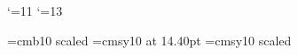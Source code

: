 

\loadeusm

\catcode`\@=11
\def\logo@{}
\catcode`\@=13

\NoRunningHeads



\font\boldtitlefont=cmb10 scaled
\font\bigsym=cmsy10 at 14.40pt 
\font\biggersym=cmsy10 scaled 

\def\dspace{\lineskip=2pt\baselineskip=18pt\lineskiplimit=0pt}
\def\wedgeop{\operatornamewithlimits{\wedge}\limits}
\def\w{{\mathchoice{\,{\scriptstyle\wedge}\,}
  {{\scriptstyle\wedge}}
  {{\scriptscriptstyle\wedge}}{{\scriptscriptstyle\wedge}}}}
\def\Le{{\mathchoice{\,{\scriptstyle\le}\,}
  {\,{\scriptstyle\le}\,}
  {\,{\scriptscriptstyle\le}\,}{\,{\scriptscriptstyle\le}\,}}}
\def\Ge{{\mathchoice{\,{\scriptstyle\ge}\,}
  {\,{\scriptstyle\ge}\,}
  {\,{\scriptscriptstyle\ge}\,}{\,{\scriptscriptstyle\ge}\,}}}
\def\vrulesub#1{\hbox{\vrule height7pt depth5pt\,}_{#1}}
\def\mapright#1{\smash{\mathop{\,\longrightarrow\,}%
     \limits^{#1}}}
\def\plus{{\sssize +}}
\def\upvee{{\sssize\vee}}
\def\underSim#1{\mathop{\vtop{\ialign{##\crcr
  \hfil {\bigsym\char'030}\hfil\crcr
  \noalign{\nointerlineskip}${\ssize #1}$\crcr
  \noalign{\nointerlineskip}\crcr}}}}

\def\eps{{\varepsilon}}
\def\Lam{{\Lambda}}
\def\mynabla{{\nabla\!}}

\def\xtil{\widetilde{x}}

\def\Adot{\Dot{A}}
\def\Bdot{\Dot{B}}
\def\Xdot{\Dot{X}}
\def\xdot{\Dot{x}}
\def\psidot{\Dot{\psi}}

\def\dbR{{\Bbb R}}

\def\I{\text{\rm I}}
\def\II{\text{\rm II}}
\def\III{\text{\rm III}}


\def\scr#1{{\fam\eusmfam\relax#1}}

\def\scrA{{\scr A}}   \def\scrB{{\scr B}}
\def\scrC{{\scr C}}   \def\scrD{{\scr D}}
\def\scrE{{\scr E}}   \def\scrF{{\scr F}}
\def\scrG{{\scr G}}   \def\scrH{{\scr H}}
\def\scrI{{\scr I}}   \def\scrJ{{\scr J}}
\def\scrK{{\scr K}}   \def\scrL{{\scr L}}
\def\scrM{{\scr M}}   \def\scrN{{\scr N}}
\def\scrO{{\scr O}}   \def\scrP{{\scr P}}
\def\scrQ{{\scr Q}}   \def\scrR{{\scr R}}
\def\scrS{{\scr S}}   \def\scrT{{\scr T}}
\def\scrU{{\scr U}}   \def\scrV{{\scr V}}
\def\scrW{{\scr W}}   \def\scrX{{\scr X}}
\def\scrY{{\scr Y}}   \def\scrZ{{\scr Z}}


